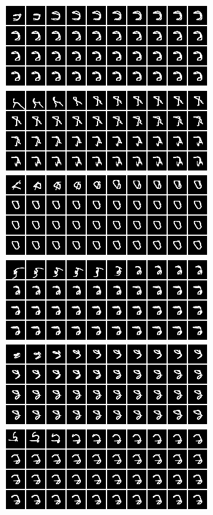 \documentclass{article}
\begin{document}
\begin{figure}[htb!]
\centering
\includegraphics[scale=0.25]{../results/debug_recon/rand_init1_20.png}
\includegraphics[scale=0.25]{../results/debug_recon/rand_init3_20.png}
\includegraphics[scale=0.25]{../results/debug_recon/rand_init4_20.png}
\includegraphics[scale=0.25]{../results/debug_recon/rand_init5_20.png}
\includegraphics[scale=0.25]{../results/debug_recon/rand_init6_20.png}
\includegraphics[scale=0.25]{../results/debug_recon/rand_init7_20.png}

\end{figure}
\end{document}

